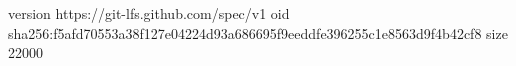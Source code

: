version https://git-lfs.github.com/spec/v1
oid sha256:f5afd70553a38f127e04224d93a686695f9eeddfe396255c1e8563d9f4b42cf8
size 22000
